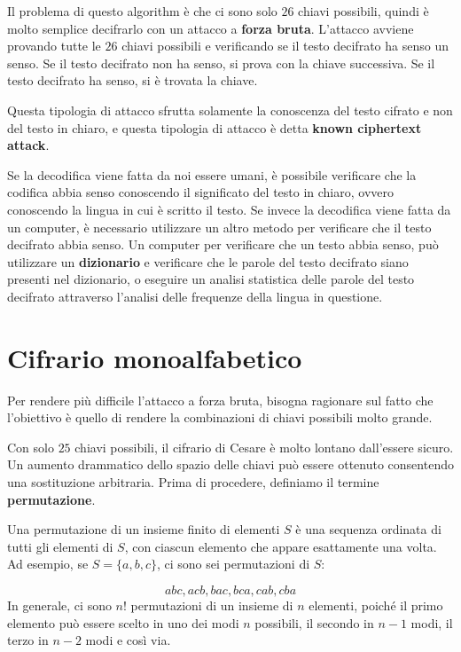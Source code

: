 Il problema di questo algorithm è che ci sono solo $26$ chiavi possibili,
quindi è molto semplice decifrarlo con un attacco a \textbf{forza bruta}.
L'attacco avviene provando tutte le $26$ chiavi possibili e verificando
se il testo decifrato ha senso un senso. Se il testo decifrato non ha senso,
si prova con la chiave successiva. Se il testo decifrato ha senso, si è trovata
la chiave.

Questa tipologia di attacco sfrutta solamente la conoscenza del testo cifrato
e non del testo in chiaro, e questa tipologia di attacco è detta \textbf{known 
ciphertext attack}.

Se la decodifica viene fatta da noi essere umani, è possibile verificare che la 
codifica abbia senso conoscendo il significato del testo in chiaro, ovvero 
conoscendo la lingua in cui è scritto il testo. Se invece la decodifica viene
fatta da un computer, è necessario utilizzare un altro metodo per verificare
che il testo decifrato abbia senso.
Un computer per verificare che un testo abbia senso, può utilizzare un
\textbf{dizionario} e verificare che le parole del testo decifrato siano
presenti nel dizionario, o eseguire un analisi statistica delle parole del
testo decifrato attraverso l'analisi delle frequenze della lingua in questione.

\section{Cifrario  monoalfabetico}
Per rendere più difficile l'attacco a forza bruta, bisogna ragionare sul fatto che 
l'obiettivo è quello di rendere la combinazioni di chiavi possibili molto grande.

Con solo $25$ chiavi possibili, il cifrario di Cesare è molto lontano
dall'essere sicuro. Un aumento drammatico dello spazio delle chiavi
può essere ottenuto consentendo una sostituzione arbitraria. Prima
di procedere, definiamo il termine \textbf{permutazione}.
\begin{tcolorbox}[title = {Permutazione}]
Una permutazione di un insieme finito di elementi $S$ è una
sequenza ordinata di tutti gli elementi di $S$, con ciascun elemento
che appare esattamente una volta. Ad esempio, se $S = \{a, b, c\}$, ci
sono sei permutazioni di $S$:
\end{tcolorbox}
\[
abc, acb, bac, bca, cab, cba
\]
In generale, ci sono $n!$ permutazioni di un insieme
di $n$ elementi, poiché il primo elemento può essere scelto in uno
dei modi $n$ possibili, il secondo in $n - 1$ modi, il terzo
in $n - 2$ modi e così via.

